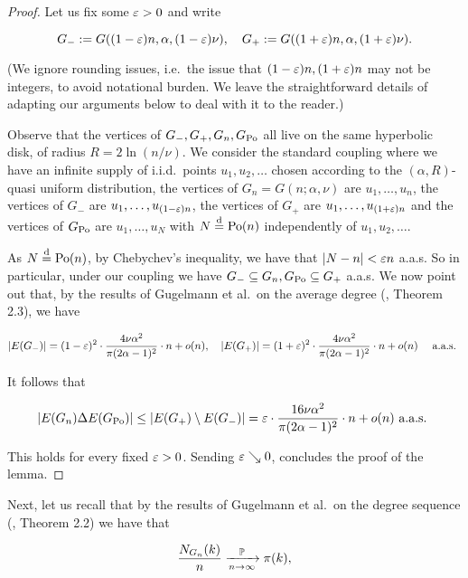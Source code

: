 \begin{proof}
Let us fix some $\varepsilon>0$ and write 

$$G_- := G((1-\varepsilon)n, \alpha, (1-\varepsilon)\nu ), \quad G_+ := G((1+\varepsilon)n, \alpha, (1+\varepsilon)\nu ). $$

\noindent
(We ignore rounding issues, i.e.~the issue that $(1-\varepsilon)n, (1+\varepsilon)n$ may not be integers, 
to avoid notational burden. We leave the straightforward details of adapting our arguments below to deal with it to the reader.)

Observe that the vertices of $G_-, G_+, G_n, G_{{\mathrm{Po}}}$ all live on the same hyperbolic disk, of radius 
$R = 2\ln(n/\nu)$. 
We consider the standard coupling where we have an infinite supply of i.i.d.~points $u_1, u_2, \dots$ chosen according
to the $(\alpha,R)$-quasi uniform distribution, the vertices of $G_n = G(n;\alpha,\nu)$ are $u_1,\dots, u_n$, 
the vertices of $G_-$ are $u_1,\dots, u_{(1-\varepsilon)n}$, the vertices of $G_+$ are $u_1,\dots, u_{(1+\varepsilon)n}$ and 
the vertices of $G_{{\mathrm{Po}}}$ are $u_1,\dots, u_N$ with $N\stackrel{\text{d}}{=} {\mathrm{Po}}(n)$ independently of
$u_1, u_2, \dots$.

As $N\stackrel{\text{d}}{=}{\mathrm{Po}}(n)$, by Chebychev's inequality, we have that $|N-n| < \varepsilon n$ a.a.s.
So in particular, under our coupling we have $G_- \subseteq G_n, G_{{\mathrm{Po}}} \subseteq G_+$ a.a.s. 
We now point out that, by the results of Gugelmann et al.~on the average degree (\cite{gugelmann2012random}, Theorem 2.3), 
we have 

$$|E(G_-)| = (1-\varepsilon)^2\cdot \frac{4\nu\alpha^2}{\pi(2\alpha-1)^2} \cdot n + o(n), \quad 
|E(G_+)| = (1+\varepsilon)^2 \cdot \frac{4\nu\alpha^2}{\pi(2\alpha-1)^2} \cdot n + o(n) \quad \text{ a.a.s. } $$

It follows that 

$$ | E(G_n) \Delta E(G_{{\mathrm{Po}}}) | \leq |E(G_+)\setminus E(G_-)|
= \varepsilon \cdot \frac{16\nu\alpha^2}{\pi(2\alpha-1)^2}\cdot n + o(n) \text{ a.a.s. }
$$

This holds for every fixed $\varepsilon>0$. Sending $\varepsilon\searrow 0$, concludes the proof of the lemma.
\end{proof}

Next, let us recall that by the results of Gugelmann et al.~on the degree sequence
(\cite{gugelmann2012random}, Theorem 2.2) we have that 

\begin{equation}\label{eq:gugeldegseqaap} 
\frac{N_{G_n}(k)}{n} \xrightarrow[n\to\infty]{\mathbb{P}} {\pi}(k), 
\end{equation}

